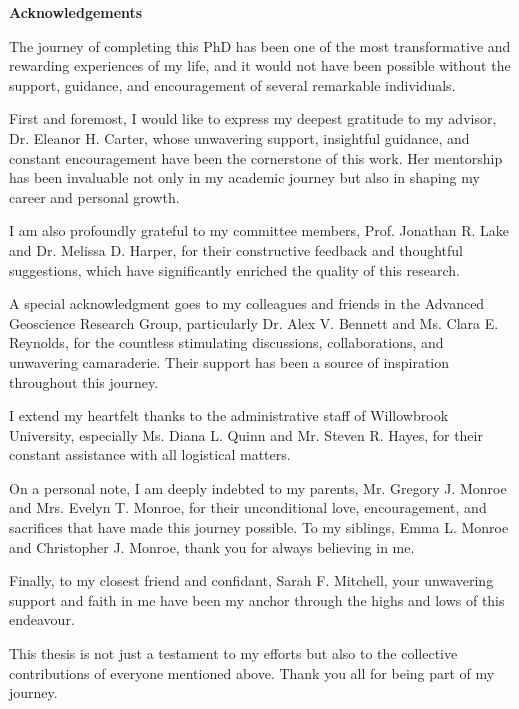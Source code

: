 \newpage
\begin{center}
{\LARGE \textbf{Acknowledgements}}
\end{center}
\justifying


The journey of completing this PhD has been one of the most transformative and rewarding experiences of my life, and it would not have been possible without the support, guidance, and encouragement of several remarkable individuals. \par

First and foremost, I would like to express my deepest gratitude to my advisor, Dr. Eleanor H. Carter, whose unwavering support, insightful guidance, and constant encouragement have been the cornerstone of this work. Her mentorship has been invaluable not only in my academic journey but also in shaping my career and personal growth.\par

I am also profoundly grateful to my committee members, Prof. Jonathan R. Lake and Dr. Melissa D. Harper, for their constructive feedback and thoughtful suggestions, which have significantly enriched the quality of this research.\par

A special acknowledgment goes to my colleagues and friends in the Advanced Geoscience Research Group, particularly Dr. Alex V. Bennett and Ms. Clara E. Reynolds, for the countless stimulating discussions, collaborations, and unwavering camaraderie. Their support has been a source of inspiration throughout this journey.\par

I extend my heartfelt thanks to the administrative staff of Willowbrook University, especially Ms. Diana L. Quinn and Mr. Steven R. Hayes, for their constant assistance with all logistical matters.\par

On a personal note, I am deeply indebted to my parents, Mr. Gregory J. Monroe and Mrs. Evelyn T. Monroe, for their unconditional love, encouragement, and sacrifices that have made this journey possible. To my siblings, Emma L. Monroe and Christopher J. Monroe, thank you for always believing in me.\par

Finally, to my closest friend and confidant, Sarah F. Mitchell, your unwavering support and faith in me have been my anchor through the highs and lows of this endeavour.\par

This thesis is not just a testament to my efforts but also to the collective contributions of everyone mentioned above. Thank you all for being part of my journey.

